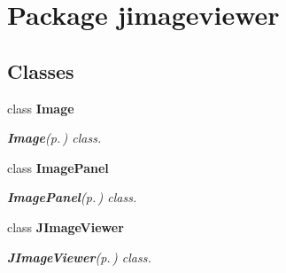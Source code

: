 \section{Package jimageviewer}
\label{namespacejimageviewer}


\subsection*{Classes}
\begin{CompactItemize}
\item 
class {\bf Image}
\begin{CompactList}\small\item\em {\bf Image}{\rm (p.\,\pageref{classjimageviewer_1_1_image})} class. \item\end{CompactList}\item 
class {\bf Image\-Panel}
\begin{CompactList}\small\item\em {\bf Image\-Panel}{\rm (p.\,\pageref{classjimageviewer_1_1_image_panel})} class. \item\end{CompactList}\item 
class {\bf JImage\-Viewer}
\begin{CompactList}\small\item\em {\bf JImage\-Viewer}{\rm (p.\,\pageref{classjimageviewer_1_1_j_image_viewer})} class. \item\end{CompactList}\end{CompactItemize}
